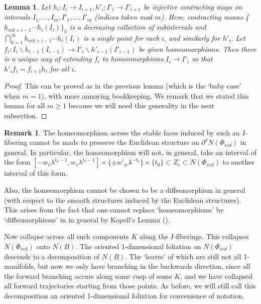 \documentclass[12pt]{amsart}
\newtheorem{lemma}[thm]{Lemma}
\theoremstyle{definition}
\newtheorem{rmk}[thm]{Remark}
\numberwithin{equation}{section}
\begin{document}
\begin{lemma} \label{lemma:expandextend}
Let $h_i:I_i \to I_{i+1}, h'_i:I'_i\to I'_{i+1}$ be injective contracting maps on intervals $I_1,...,I_m,I'_1,...,I'_m$ (indices taken mod $m$). Here, contracting means \{$h_{mk+i-1} \cdots h_i (I_i)\}_k$ is a decreasing collection of subintervals and $\bigcap_{k=1}^\infty h_{mk+i-1} \cdots h_i (I_i)$ is a single point for each $i$, and similarly for $h'_i$. Let $f_i:I_i \backslash h_{i-1}(I_{i-1}) \to I'_i \backslash h'_{i-1}(I'_{i-1})$ be given homeomorphisms. Then there is a unique way of extending $f_i$ to homeomorphisms $I_i \to I'_i$ so that $h'_i f_i=f_{i+1} h_i$ for all $i$.
\end{lemma}

\begin{proof}
This can be proved as in the previous lemma (which is the `baby case' when $m=1$), with more annoying bookkeeping. We remark that we stated this lemma for all $m \geq 1$ because we will need this generality in the next subsection.
\end{proof}

\begin{rmk} \label{rmk:kopell}
The homeomorphism across the stable faces induced by such an $I$-fibering cannot be made to preserve the Euclidean structure on $\partial^s N(\Phi_{red})$ in general. In particular, the homeomorphism will not, in general, take an interval of the form $[-w_v \lambda^{t_0-1}, w_v \lambda^{t_0-1}] \times \{ \pm w'_w \lambda^{-t_0} \} \times \{ t_0 \} \subset Z_e \subset N(\Phi_{red})$ to another interval of this form.

Also, the homeomorphism cannot be chosen to be a diffeomorphism in general (with respect to the smooth structures induced by the Euclidean structures). This arises from the fact that one cannot replace `homeomorphisms' by `diffeomorphisms' in  in general by Kopell's Lemma (\cite{Kop70}). 
\end{rmk}

Now collapse across all such components $K$ along the $I$-fiberings. This collapses $N(\Phi_{red})$ onto $N(B)$. The oriented 1-dimensional foliation on $N(\Phi_{red})$ descends to a decomposition of $N(B)$. The `leaves' of which are still not all 1-manifolds, but now we only have branching in the backwards direction, since all the forward branching occurs along some cusp of some $K$, and we have collapsed all forward trajectories starting from those points. As before, we will still call this decomposition an oriented 1-dimensional foliation for convenience of notation.
\end{document}
